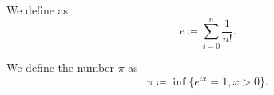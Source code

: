 \begin{definition}\label{def:eulers_constant}
  We define  as
  \begin{equation*}
    e \coloneqq \sum_{i=0}^n \frac 1 {n!}.
  \end{equation*}
\end{definition}

\begin{definition}\label{def:pi}\cite[515]{Knapp2016BAlg}
  We define the number \( \pi \) as
  \begin{equation*}
    \pi \coloneqq \inf\{ e^{ix} = 1, x > 0 \}.
  \end{equation*}
\end{definition}
